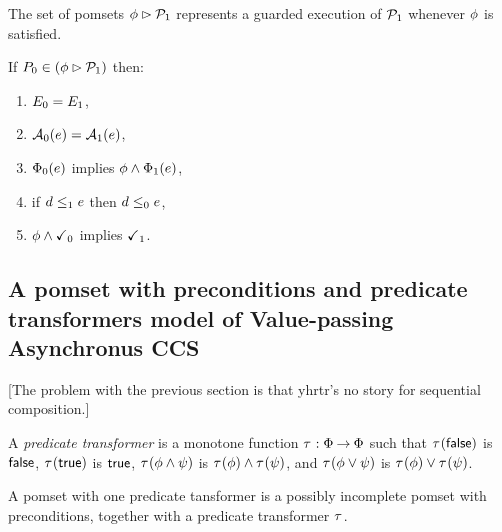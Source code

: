 The set of pomsets $\phi\mathbin\rhd\mathcal{P}_1$ represents a guarded execution of $\mathcal{P}_1$ whenever $\phi$ is satisfied.
\begin{definition}
  \label{defn:pomset-guard}
  If $P_0 \in (\phi\mathbin\rhd\mathcal{P}_1)$ then:
  \begin{enumerate}
  \item $E_0 = E_1$,
  \item $\mathcal{A}_0(e) = \mathcal{A}_1(e)$,
  \item $\Phi_0(e)$ implies $\phi\land\Phi_1(e)$,
  \item if $d\le_1e$ then $d\le_0e$,
  \item $\phi\land\checkmark_0$ implies $\checkmark_1$.
    \setcounter{pomsetGuardCount}{\value{enumi}}
  \end{enumerate}
\end{definition}

\subsection{A pomset with preconditions and predicate transformers model of Value-passing Asynchronus CCS}

[The problem with the previous section is that yhrtr's no story for sequential composition.]

\begin{definition}
  A \emph{predicate transformer} is a monotone function
  $\tau^{}:\Phi\mathbin\rightarrow\Phi$ such that
  $\tau^{}(\mathsf{false})$ is $\mathsf{false}$,
  $\tau^{}(\mathsf{true})$ is $\mathsf{true}$,
  $\tau^{}(\phi\land\psi)$ is $\tau^{}(\phi)\land\tau^{}(\psi)$, and
  $\tau^{}(\phi\lor\psi)$ is $\tau^{}(\phi)\lor\tau^{}(\psi)$.
\end{definition}

\begin{definition}
  A pomset with one predicate tansformer is a possibly incomplete
  pomset with preconditions, together with a predicate transformer $\tau^{}$.
\end{definition}

